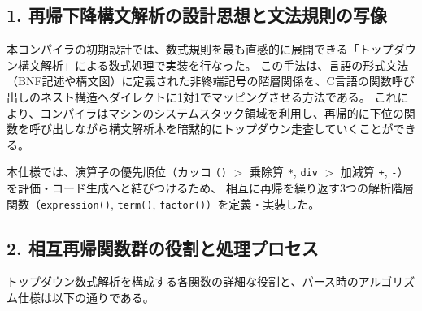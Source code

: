 \documentclass[11pt,a4paper,dvipdfmx]{bxjsarticle}
\begin{document}
\subsection*{1. 再帰下降構文解析の設計思想と文法規則の写像}
本コンパイラの初期設計では、数式規則を最も直感的に展開できる「トップダウン構文解析」による数式処理で実装を行なった。
この手法は、言語の形式文法（BNF記述や構文図）に定義された非終端記号の階層関係を、C言語の関数呼び出しのネスト構造へダイレクトに1対1でマッピングさせる方法である。
これにより、コンパイラはマシンのシステムスタック領域を利用し、再帰的に下位の関数を呼び出しながら構文解析木を暗黙的にトップダウン走査していくことができる。

本仕様では、演算子の優先順位（カッコ \texttt{()} $>$ 乗除算 \texttt{*}, \texttt{div} $>$ 加減算 \texttt{+}, \texttt{-}）を評価・コード生成へと結びつけるため、
相互に再帰を繰り返す3つの解析階層関数（\texttt{expression()}, \texttt{term()}, \texttt{factor()}）を定義・実装した。

\subsection*{2. 相互再帰関数群の役割と処理プロセス}
トップダウン数式解析を構成する各関数の詳細な役割と、パース時のアルゴリズム仕様は以下の通りである。
\end{document}
